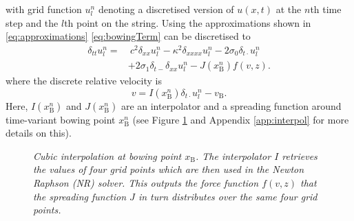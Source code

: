 \documentclass[twoside,a4paper]{article}
\begin{document}
with grid function $u_l^n$ denoting a discretised version of $u(x,t)$ at the $n$th time step and the $l$th point on the string. Using the approximations shown in \eqref{eq:approximations} \eqref{eq:bowingTerm} can be discretised to
\begin{equation}
  \begin{aligned}
    \label{eq:FDS}
        \delta_{tt} u_l^n = &\: c^2 \delta_{xx} u_l^n -\kappa^2\delta_{xxxx} u_l^n - 2\sigma_0\delta_{t\cdot} u_l^n
        \\ 
        &+ 2\sigma_1\delta_{t-}\delta_{xx}u_l^n - J(x_\text{B}^n)f(v, z).
    \end{aligned}
\end{equation}
where the discrete relative velocity is
\begin{equation}\label{eq:discRelVel}
v = I(x_\text{B}^n)\delta_{t\cdot}u_l^n -  v_\text{B}.
\end{equation}
Here, $I(x_\text{B}^n)$ and $J(x_\text{B}^n)$ are an interpolator and a spreading function around time-variant bowing point $x_\text{B}^n$ (see Figure \ref{fig:interpol} and Appendix \ref{app:interpol} for more details on this).
\begin{figure}[h]
    \centering
    \caption{\it Cubic interpolation at bowing point $x_\text{B}$. The interpolator $I$ retrieves the values of four grid points which are then used in the Newton Raphson (NR) solver. This outputs the force function $f(v,z)$ that the spreading function $J$ in turn distributes over the same four grid points.}
    \label{fig:interpol}
\end{figure}
\end{document}
